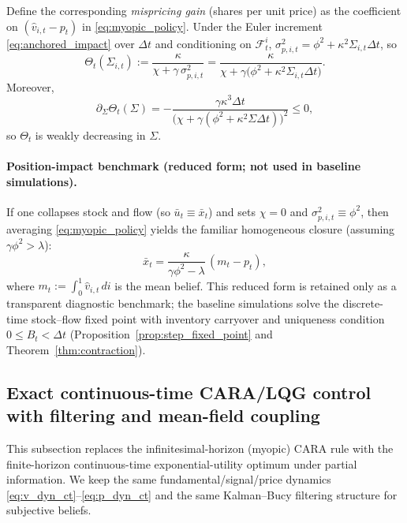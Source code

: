 Define the corresponding \emph{mispricing gain} (shares per unit price) as the coefficient on $(\hat v_{i,t}-p_t)$ in \eqref{eq:myopic_policy}. Under the Euler increment \eqref{eq:anchored_impact} over $\Delta t$ and conditioning on $\mathcal F^i_t$, $\sigma^2_{p,i,t}=\phi^2+\kappa^2\Sigma_{i,t}\Delta t$, so
\begin{equation}
\Theta_t(\Sigma_{i,t})
:=
\frac{\kappa}{\chi+\gamma\,\sigma^2_{p,i,t}}
=
\frac{\kappa}{\chi+\gamma\bigl(\phi^2+\kappa^2\Sigma_{i,t}\Delta t\bigr)}.
\label{eq:theta_def}
\end{equation}
Moreover,
\[
\partial_\Sigma \Theta_t(\Sigma)
=
-\frac{\gamma \kappa^3 \Delta t}{\bigl(\chi+\gamma(\phi^2+\kappa^2\Sigma\Delta t)\bigr)^2}\le 0,
\]
so $\Theta_t$ is weakly decreasing in $\Sigma$.

\paragraph{Position-impact benchmark (reduced form; not used in baseline simulations).}
If one collapses stock and flow (so $\bar u_t\equiv \bar x_t$) and sets $\chi=0$ and $\sigma^2_{p,i,t}\equiv\phi^2$, then averaging \eqref{eq:myopic_policy} yields the familiar homogeneous closure (assuming $\gamma\phi^2>\lambda$):
\begin{equation}
\bar x_t = \frac{\kappa}{\gamma\phi^2-\lambda}\,(m_t-p_t),
\label{eq:mean_field_closure}
\end{equation}
where $m_t := \int_0^1 \hat v_{i,t}\,di$ is the mean belief. This reduced form is retained only as a transparent diagnostic benchmark; the baseline simulations solve the discrete-time stock--flow fixed point with inventory carryover and uniqueness condition $0\le B_t<\Delta t$ (Proposition~\ref{prop:step_fixed_point} and Theorem~\ref{thm:contraction}).

\subsection{Exact continuous-time CARA/LQG control with filtering and mean-field coupling}
\label{subsec:ct_cara_lqg}

This subsection replaces the infinitesimal-horizon (myopic) CARA rule with the
finite-horizon continuous-time exponential-utility optimum under partial information.
We keep the same fundamental/signal/price dynamics \eqref{eq:v_dyn_ct}--\eqref{eq:p_dyn_ct}
and the same Kalman--Bucy filtering structure for subjective beliefs.


